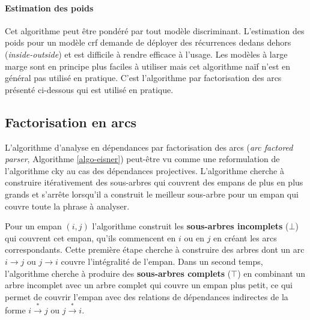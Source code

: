 \documentclass[11pt,openany]{book}
\begin{document}
\paragraph{Estimation des poids}
Cet algorithme peut être pondéré par tout modèle discriminant.
L'estimation des poids pour un modèle {\sc crf} demande de déployer 
des récurrences dedans dehors ({\em inside-outside}) et est difficile à rendre efficace à l'usage. Les modèles à large marge sont en
principe plus faciles à utiliser mais cet algorithme naïf n'est en
général pas utilisé en pratique. C'est l'algorithme par factorisation
des arcs présenté ci-dessous qui est utilisé en pratique.

\subsection{Factorisation en arcs}
\label{sec-arc-factored}
L'algorithme d'analyse en dépendances par factorisation des arcs ({\em arc factored parser}, Algorithme \ref{algo-eisner})
peut-être vu comme une reformulation de l'algorithme {\sc cky} au cas des dépendances projectives.
L'algorithme cherche à construire itérativement des sous-arbres qui couvrent des empans de plus en plus grands
et s'arrête lorsqu'il a construit le meilleur sous-arbre pour  un empan qui couvre toute la phrase à analyser.

Pour un empan $(i,j)$ l'algorithme construit les {\bf sous-arbres incomplets} ($\bot$) qui couvrent cet empan, qu'ils commencent en $i$ ou en $j$
en créant les arcs correspondants. Cette première étape cherche à construire des arbres dont un arc $i\rightarrow j$ ou $j\rightarrow i$
couvre l'intégralité de l'empan. Dans un second temps, l'algorithme cherche à produire des {\bf sous-arbres complets} ($\top$) en combinant
 un arbre incomplet avec un arbre complet qui couvre un empan plus petit, ce qui permet de couvrir l'empan avec des relations de dépendances indirectes de la forme $i\stackrel{*}{\rightarrow} j$ ou
$j\stackrel{*}{\rightarrow} i$.
\end{document}
